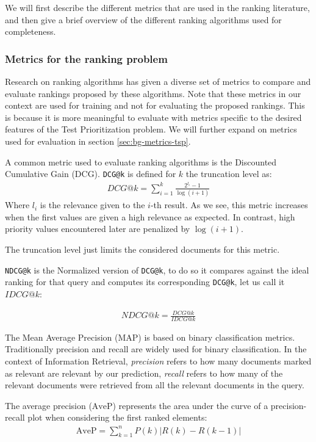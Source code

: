 We will first describe the different metrics that are used in the ranking literature, and then
give a brief overview of the different ranking algorithms used for completeness.

\subsubsection{Metrics for the ranking problem}\label{s:bg-rnk-metrics}
Research on ranking algorithms has given a diverse set of metrics to compare and evaluate
rankings proposed by these algorithms. Note that these metrics in our context are used for
training and not for evaluating the proposed rankings. This is because it is more meaningful
to evaluate with metrics specific to the desired features of the Test Prioritization problem.
We will further expand on metrics used for evaluation in section \ref{sec:bg-metrics-tsp}.

A common metric used to evaluate ranking algorithms is the Discounted Cumulative Gain (DCG).
\texttt{DCG@k} is defined for $k$ the truncation level as:
\begin{align*}
DCG@k = \sum_{i=1}^{k}\frac{2^{l_i}-1}{\log(i+1)}
\end{align*}
Where $l_i$ is the relevance given to the $i$-th result. As we see, this metric increases
when the first values are given a high relevance as expected. In contrast, high priority
values encountered later are penalized by $\log(i+1)$.

The truncation level just limits the considered documents for this metric.

\texttt{NDCG@k} is the Normalized version of \texttt{DCG@k}, to do so it compares against
the ideal ranking for that query and computes its corresponding \texttt{DCG@k}, let us
call it $IDCG@k$:

\begin{align*}
NDCG@k = \frac{DCG@k}{IDCG@k}
\end{align*}

The Mean Average Precision (MAP) is based on binary classification metrics. Traditionally
precision and recall are widely used for binary classification. In the context of
Information Retrieval, \emph{precision} refers to how many documents marked as relevant
are relevant by our prediction, \emph{recall} refers to how many of the relevant documents
were retrieved from all the relevant documents in the query. 

The average precision ($\text{AveP}$) represents the area under the curve of a precision-recall
plot when considering the first ranked elements:
\begin{align*}
\text{AveP} = \sum_{k=1}^{n} P(k)|R(k)-R(k-1)|
\end{align*}

